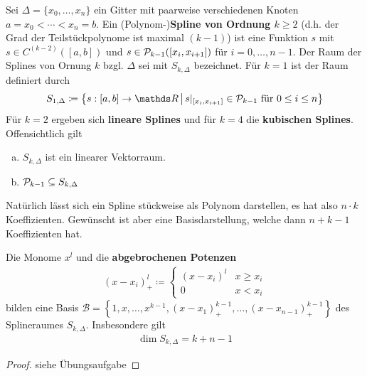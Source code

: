 \begin{Defe}
  Sei $\Delta =\{x_0,\dotsc,x_n\} $ ein Gitter
  mit paarweise verschiedenen Knoten $a=x_0<\dotsb<x_n=b$.
  Ein (Polynom-)\textbf{Spline von Ordnung $k$}$\geq 2$ 
  (d.h. der Grad der Teilstückpolynome ist maximal $(k-1)$)
  ist eine Funktion $s$ mit $s\in C^{(k-2)}([a,b])$
  und $s\in\mathcal{P}_{k-1}([x_i,x_{i+1}])$
  für $i=0,\dotsc,n-1$.
  Der Raum der Splines von Ornung $k$ bzgl. $\Delta$ sei
  mit $S_{k,\Delta}$ bezeichnet.
  Für $k=1$ ist der Raum definiert durch
  \begin{gather*}
    S_{1,\Delta} \coloneqq 
    \left\{
      s:[a,b]\rightarrow\R\,\middle\vert\,
      s|_{[x_i,x_{i+1}]}\in\p_{k-1}
      \text{ für } 0\leq i\leq n
    \right\}
  \end{gather*}
  Für $k=2$ ergeben sich \textbf{lineare Splines}
  und für $k=4$ die \textbf{kubischen Splines}.
  Offensichtlich gilt
  \begin{enumerate}[a)]
  \item $S_{k,\Delta}$ ist ein linearer Vektorraum.
  \item $\mathcal{P}_{k-1}\subseteq S_{k,\Delta}$
  \end{enumerate}
  Natürlich lässt sich ein Spline stückweise als Polynom darstellen,
  es hat also $n\cdot k$ Koeffizienten.
  Gewünscht ist aber eine Basisdarstellung,
  welche dann $n+k-1$ Koeffizienten hat.
\end{Defe}

\begin{Satze}\label{6.2.2}
  Die Monome $x^l$ und die \textbf{abgebrochenen Potenzen}
  \begin{gather}
    (x-x_i)_+^l\coloneqq
    \begin{cases}
      (x-x_i)^l & x\geq x_i\\
      0         & x<x_i
    \end{cases}
    \label{VI.2.1}
  \end{gather}
  bilden eine Basis
  $\mathcal{B}= \left\{
    1,x,\dotsc,x^{k-1},(x-x_1)_+^{k-1},\dotsc,(x-x_{n-1})_+^{k-1}
  \right\}$
  des Splineraumes $S_{k,\Delta}$. Insbesondere gilt
  \begin{gather}
    \dim S_{k,\Delta}=k+n-1
    \label{VI.2.2}
  \end{gather}
  \label{im6.2.2}

  \begin{proof}
    siehe Übungsaufgabe
  \end{proof}
\end{Satze}


